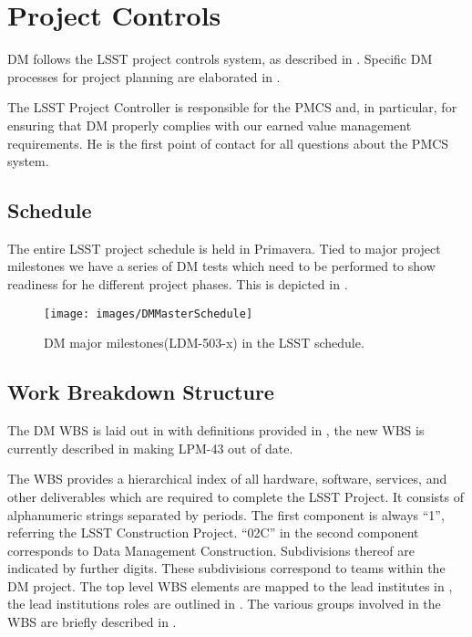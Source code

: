 \newpage
\section{Project Controls}\label{sect:dmpc}

DM follows the LSST project controls system, as described in .
Specific DM processes for project planning are elaborated in .

The LSST Project Controller is responsible for the PMCS and, in particular, for ensuring that DM properly complies with our earned value management requirements.
He is the first point of contact for all questions about the PMCS system.

\subsection{Schedule  \label{sect:schedule} }
The entire LSST project schedule is held in Primavera. Tied to major project milestones we have  a series of DM tests which need to be performed to show readiness for he different project phases.
This is depicted in .

\begin{figure}[htbp]
	\begin{center}
		 \texttt{[image: images/DMMasterSchedule]}
		 \caption{DM major milestones(LDM-503-x) in the LSST schedule. \label{fig:schedule}}
	 \end{center}
 \end{figure}



\subsection{Work Breakdown Structure} \label{sect:WBS}

The DM WBS is laid out in  with definitions provided in ,
the new WBS is currently described in  making LPM-43 out of date.

The WBS provides a hierarchical index of all hardware, software, services, and other deliverables which are required to complete the LSST Project.
It consists of alphanumeric strings separated by periods.
The first component is always “1”, referring the LSST Construction Project.
``02C'' in the second component corresponds to Data Management Construction.
Subdivisions thereof are indicated by further digits.
These subdivisions correspond to teams within the DM project.
The top level WBS elements are mapped to the lead institutes in , the lead institutions roles are outlined in .
The various groups involved in the WBS are briefly described in .

